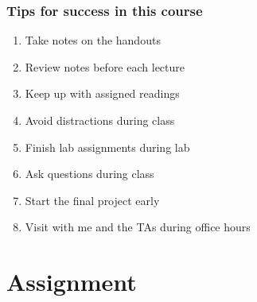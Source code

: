 \documentclass[color=usenames,dvipsnames]{beamer}
\begin{document}
\begin{frame}
  \frametitle{Tips for success in this course}
  \begin{enumerate}[(1)]
    \Large
    \item Take notes on the handouts 
    \item Review notes before each lecture 
    \item Keep up with assigned readings
    \item Avoid distractions during class
    \item Finish lab assignments during lab %
    \item Ask questions during class%
    \item Start the final project early
    \item Visit with me and the TAs during office hours %
  \end{enumerate}
\end{frame}





\section{Assignment}
\end{document}
